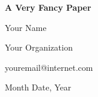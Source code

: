 \noindent
\textbf{A Very Fancy Paper}

\noindent
Your Name

\noindent
Your Organization

\noindent
youremail@internet.com

\noindent
Month Date, Year
